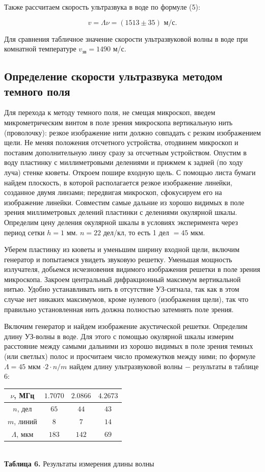 \documentclass[a4paper,12pt]{article} %
\begin{document}
\hfill \break Также рассчитаем скорость ультразвука в воде по формуле (5):

$$
v = \Lambda \nu = (1513 \pm 35) \text{ м/с}.
$$

\hfill \break Для сравнения табличное значение скорости ультразвуковой волны в воде при комнатной температуре $v_{\text{зв}} = 1490$ м/с.

\subsection{Определение скорости ультразвука методом темного поля}
\hfill \break Для перехода к методу темного поля, не смещая микроскоп, введем микрометрическим винтом в поле зрения микроскопа вертикальную нить (проволочку): резкое изображение нити должно совпадать с резким изображением щели. Не меняя положения отсчетного устройства, отодвинем микроскоп и поставим дополнительную линзу сразу за отсчетным устройством. Опустим в воду пластинку с миллиметровыми делениями и прижмем к задней (по ходу луча) стенке кюветы. Откроем пошире входную щель. С помощью листа бумаги найдем плоскость, в которой располагается резкое изображение линейки, созданное двумя линзами; передвигая микроскоп, сфокусируем его на изображение линейки. Совместим самые дальние из хорошо видимых в поле зрения миллиметровых делений пластинки с делениями окулярной шкалы. Определим цену деления окулярной шкалы в условиях эксперимента через период сетки $h = 1$ мм. $n = 22$ дел/кл, то есть 1 дел $= 45$ мкм. 

\hfill \break Уберем пластинку из кюветы и уменьшим ширину входной щели, включим генератор и попытаемся увидеть звуковую решетку. Уменьшая мощность излучателя, добьемся исчезновения видимого изображения решетки в поле зрения микроскопа. Закроем центральный дифракционный максимум вертикальной нитью. Удобно устанавливать нить в отсутствие УЗ-сигнала, так как в этом случае нет никаких максимумов, кроме нулевого (изображения щели), так что правильно установленная нить должна полностью затемнять поле зрения. 

\hfill \break Включим генератор и найдем изображение акустической решетки. Определим длину УЗ-волны в воде. Для этого с помощью окулярной шкалы измерим расстояние между самыми дальними из хорошо видимых в поле зрения темных (или светлых) полос и просчитаем число промежутков между ними; по формуле $\Lambda = 45$ мкм $\cdot 2 \cdot n/m$ найдем длину ультразвуковой волны $-$ результаты в таблице 6:

\begin{center}
\begin{tabular}{|c|c|c|c|}\hline
$ \nu $, МГц & $ 1.7070 $ & $ 2.0866 $ & $ 4.2673 $ \\\hline
$ n $, дел & $ 65 $ & $ 44 $ & $ 43 $ \\\hline
$ m $, линий & $ 8 $ & $ 7 $ & $ 14 $ \\\hline
$ \Lambda $, мкм & $ 183 $ & $ 142 $ & $ 69 $ \\\hline
\end{tabular} \\
\hfill \break \textbf {Таблица 6.} Результаты измерения длины волны \\
\end{center}
\end{document}
